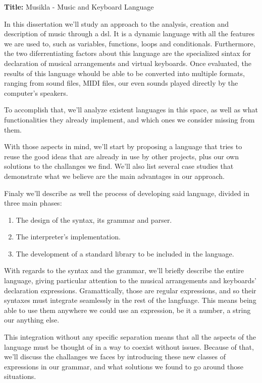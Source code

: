 \textbf{Title:} Musikla - Music and Keyboard Language

\bigskip
In this dissertation we'll study an approach to the analysis, creation and description of music through a \acrfull{dsl}. It is a dynamic language with all the features we are used to, such as variables, functions, loops and conditionals. Furthermore, the two diferrentiating factors about this language are the specialized sintax for declaration of musical arrangements and virtual keyboards. Once evaluated, the results of this language whould be able to be converted into multiple formats, ranging from sound files, MIDI files, our even sounds played directly by the computer's speakers.

To accomplish that, we'll analyze existent languages in this space, as well as what functionalities they already implement, and which ones we consider missing from them.

With those aspects in mind, we'll start by proposing a language that tries to reuse the good ideas that are already in use by other projects, plus our own solutions to the challanges we find. We'll also list several case studies that demonstrate what we believe are the main advantages in our approach.

Finaly we'll describe as well the process of developing said language, divided in three main phases:
\begin{enumerate}
    \item The design of the syntax, its grammar and parser.
    \item The interpreter's implementation.
    \item The development of a standard library to be included in the language.
\end{enumerate}

With regards to the syntax and the grammar, we'll briefly describe the entire language, giving particular attention to the musical arrangements and keyboards' declaration expressions. Gramattically, those are regular expressions, and so their syntaxes must integrate seamlessly in the rest of the langfuage. This means being able to use them anywhere we could use an expression, be it a number, a string our anything else.

This integration without any specific separation means that all the aspects of the language must be thought of in a way to coexist without issues. Because of that, we'll discuss the challanges we faces by introducing these new classes of expressions in our grammar, and what solutions we found to go around those situations.

